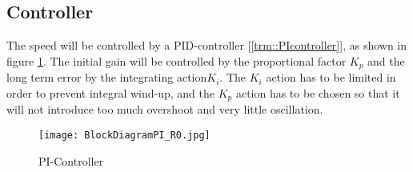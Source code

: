 \subsection{Controller}
\label{sec::controller}
The speed will be controlled by a PID-controller [\ref{trm::PIcontroller}], as shown in figure \ref{fig::picontrol}.
The initial gain will be controlled by the proportional factor $K_p$ and the long term error by the integrating action$K_i$. The $K_i$ action has to be limited in order to prevent integral wind-up, and the $K_p$ action has to be chosen so that it will not introduce too much overshoot and very little oscillation.

\begin{figure}[H]
\centering
\texttt{[image: BlockDiagramPI\_R0.jpg]}
\caption{PI-Controller}
\label{fig::picontrol}
\end{figure}

\newpage
